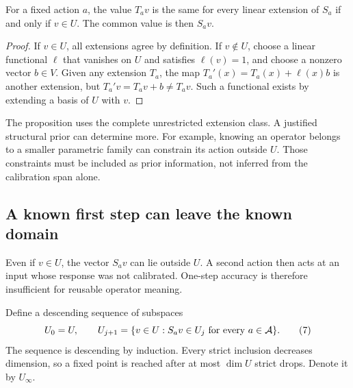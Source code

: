 \begin{GAproposition}\label{GA:prop:onestep}
For a fixed action $a$, the value $T_av$ is the same for every linear extension of $S_a$ if and only if $v\in U$. The common value is then $S_av$.
\end{GAproposition}
\begin{proof}
If $v\in U$, all extensions agree by definition. If $v\notin U$, choose a linear functional $\ell$ that vanishes on $U$ and satisfies $\ell(v)=1$, and choose a nonzero vector $b\in V$. Given any extension $T_a$, the map $T_a'(x)=T_a(x)+\ell(x)b$ is another extension, but $T_a'v=T_av+b\ne T_av$. Such a functional exists by extending a basis of $U$ with $v$.
\end{proof}

The proposition uses the complete unrestricted extension class. A justified structural prior can determine more. For example, knowing an operator belongs to a smaller parametric family can constrain its action outside $U$. Those constraints must be included as prior information, not inferred from the calibration span alone.

\subsection{A known first step can leave the known domain}
Even if $v\in U$, the vector $S_av$ can lie outside $U$. A second action then acts at an input whose response was not calibrated. One-step accuracy is therefore insufficient for reusable operator meaning.

Define a descending sequence of subspaces
\[
U_0=U,\qquad
U_{j+1}=\{v\in U:S_av\in U_j\text{ for every }a\in\mathcal A\}.\tag{7}
\]
The sequence is descending by induction. Every strict inclusion decreases dimension, so a fixed point is reached after at most $\dim U$ strict drops. Denote it by $U_\infty$.

